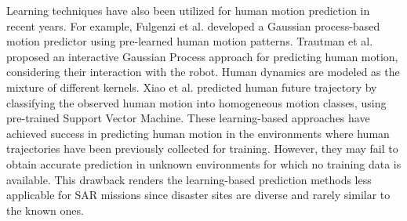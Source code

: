 \documentclass[journal]{IEEEtran}
\newcommand{\todohere}[1]{\hl{(\textbf{TODO:} #1)}}
\begin{document}
	Learning techniques have also been utilized for human motion prediction in recent years. 
	For example, Fulgenzi et al. \cite{fulgenzi2008probabilistic} developed a Gaussian process-based motion predictor using pre-learned human motion patterns.
    Trautman et al. \cite{trautman2015robot} proposed an interactive Gaussian Process approach for predicting human motion, considering their interaction with the robot. Human dynamics are modeled as the mixture of different kernels.
    Xiao et al. \cite{xiao2015unsupervised} predicted human future trajectory by classifying the observed human motion into homogeneous motion classes, using pre-trained Support Vector Machine.
	These learning-based approaches have achieved success in predicting human motion in the environments where human trajectories have been previously collected for training.
	However, they may fail to obtain accurate prediction in unknown environments for which no training data is available.
	This drawback renders the learning-based prediction methods less applicable for SAR missions since disaster sites are diverse and rarely similar to the known ones.
	
\end{document}
